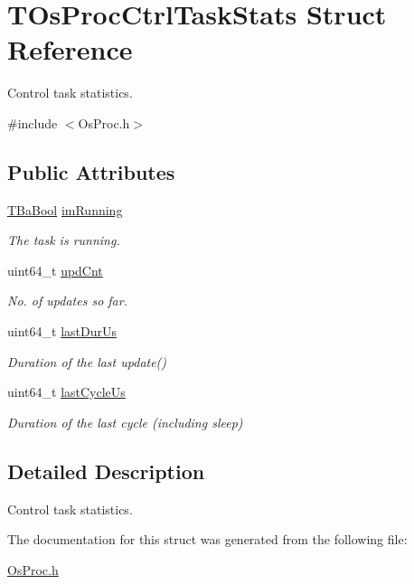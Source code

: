 \hypertarget{structTOsProcCtrlTaskStats}{}\section{T\+Os\+Proc\+Ctrl\+Task\+Stats Struct Reference}
\label{structTOsProcCtrlTaskStats}


Control task statistics.  




{\ttfamily \#include $<$Os\+Proc.\+h$>$}

\subsection*{Public Attributes}
\begin{DoxyCompactItemize}
\item 
\mbox{\label{structTOsProcCtrlTaskStats_a010696a1e99efa5bb7b1c38ad3c72dcb}} 
\hyperlink{BaBool_8h_a5fe1eb8d6ba045ac2251a8f369c2e7b6}{T\+Ba\+Bool} \hyperlink{structTOsProcCtrlTaskStats_a010696a1e99efa5bb7b1c38ad3c72dcb}{im\+Running}
\begin{DoxyCompactList}\small\item\em The task is running. \end{DoxyCompactList}\item 
\mbox{\label{structTOsProcCtrlTaskStats_ad4a3b8c19e030c383123d44a46414ceb}} 
uint64\+\_\+t \hyperlink{structTOsProcCtrlTaskStats_ad4a3b8c19e030c383123d44a46414ceb}{upd\+Cnt}
\begin{DoxyCompactList}\small\item\em No. of updates so far. \end{DoxyCompactList}\item 
\mbox{\label{structTOsProcCtrlTaskStats_a0f0c5b7cd8ac63e69aec6dd1866c744a}} 
uint64\+\_\+t \hyperlink{structTOsProcCtrlTaskStats_a0f0c5b7cd8ac63e69aec6dd1866c744a}{last\+Dur\+Us}
\begin{DoxyCompactList}\small\item\em Duration of the last {\ttfamily update()} \end{DoxyCompactList}\item 
\mbox{\label{structTOsProcCtrlTaskStats_a1e97d1091f02afc81a234df2f375beda}} 
uint64\+\_\+t \hyperlink{structTOsProcCtrlTaskStats_a1e97d1091f02afc81a234df2f375beda}{last\+Cycle\+Us}
\begin{DoxyCompactList}\small\item\em Duration of the last cycle (including sleep) \end{DoxyCompactList}\end{DoxyCompactItemize}


\subsection{Detailed Description}
Control task statistics. 

The documentation for this struct was generated from the following file\+:\begin{DoxyCompactItemize}
\item 
\hyperlink{OsProc_8h}{Os\+Proc.\+h}\end{DoxyCompactItemize}
